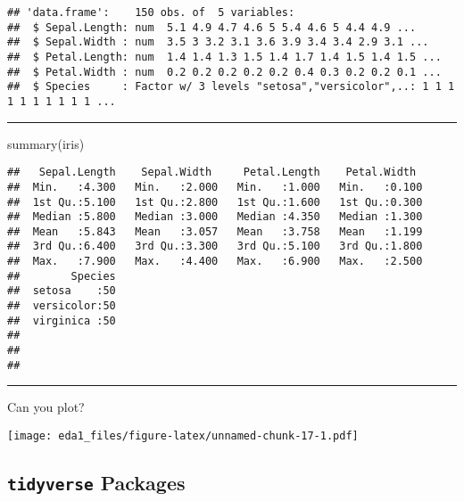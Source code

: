 \documentclass[
]{article}
\newenvironment{Shaded}{\begin{snugshade}}{\end{snugshade}}
\newcommand{\FunctionTok}[1]{\textcolor[rgb]{0.00,0.00,0.00}{#1}}
\newcommand{\NormalTok}[1]{#1}
\newcommand{\SpecialCharTok}[1]{\textcolor[rgb]{0.00,0.00,0.00}{#1}}
\begin{document}
\begin{verbatim}
## 'data.frame':    150 obs. of  5 variables:
##  $ Sepal.Length: num  5.1 4.9 4.7 4.6 5 5.4 4.6 5 4.4 4.9 ...
##  $ Sepal.Width : num  3.5 3 3.2 3.1 3.6 3.9 3.4 3.4 2.9 3.1 ...
##  $ Petal.Length: num  1.4 1.4 1.3 1.5 1.4 1.7 1.4 1.5 1.4 1.5 ...
##  $ Petal.Width : num  0.2 0.2 0.2 0.2 0.2 0.4 0.3 0.2 0.2 0.1 ...
##  $ Species     : Factor w/ 3 levels "setosa","versicolor",..: 1 1 1 1 1 1 1 1 1 1 ...
\end{verbatim}

\begin{center}\rule{0.5\linewidth}{0.5pt}\end{center}

\begin{Shaded}
\begin{Highlighting}[]
\FunctionTok{summary}\NormalTok{(iris)}
\end{Highlighting}
\end{Shaded}

\begin{verbatim}
##   Sepal.Length    Sepal.Width     Petal.Length    Petal.Width   
##  Min.   :4.300   Min.   :2.000   Min.   :1.000   Min.   :0.100  
##  1st Qu.:5.100   1st Qu.:2.800   1st Qu.:1.600   1st Qu.:0.300  
##  Median :5.800   Median :3.000   Median :4.350   Median :1.300  
##  Mean   :5.843   Mean   :3.057   Mean   :3.758   Mean   :1.199  
##  3rd Qu.:6.400   3rd Qu.:3.300   3rd Qu.:5.100   3rd Qu.:1.800  
##  Max.   :7.900   Max.   :4.400   Max.   :6.900   Max.   :2.500  
##        Species  
##  setosa    :50  
##  versicolor:50  
##  virginica :50  
##                 
##                 
## 
\end{verbatim}

\begin{center}\rule{0.5\linewidth}{0.5pt}\end{center}

Can you plot?

\begin{Shaded}
\end{Shaded}

\texttt{[image: eda1\_files/figure-latex/unnamed-chunk-17-1.pdf]}

\hypertarget{tidyverse-packages}{%
\subsection{\texorpdfstring{\texttt{tidyverse}
Packages}{tidyverse Packages}}\label{tidyverse-packages}}
\end{document}

